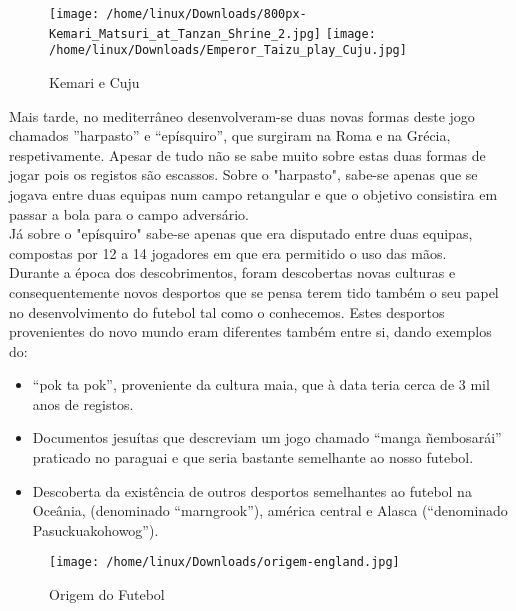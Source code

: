 \documentclass[a4paper,12pt]{report}
\begin{document}
\begin{figure}[!htp]
\texttt{[image: /home/linux/Downloads/800px-Kemari\_Matsuri\_at\_Tanzan\_Shrine\_2.jpg]}
\texttt{[image: /home/linux/Downloads/Emperor\_Taizu\_play\_Cuju.jpg]}
\caption{Kemari e Cuju}
\end{figure}

\newpage
Mais tarde, no mediterrâneo desenvolveram-se duas novas formas deste jogo chamados ”harpasto” e “epísquiro”, que surgiram na Roma e na Grécia, respetivamente. Apesar de tudo não se sabe muito sobre estas duas formas de jogar pois os registos são escassos. Sobre o "harpasto", sabe-se apenas que se jogava entre duas equipas num campo retangular e que o objetivo consistira em passar a bola para o campo adversário.\\ 
Já sobre o "epísquiro"   sabe-se apenas que era disputado entre duas equipas, compostas por 12 a 14 jogadores em que era permitido o uso das mãos. \\
Durante a época dos descobrimentos, foram descobertas novas culturas e consequentemente novos desportos que se pensa terem tido também o seu papel no desenvolvimento do futebol tal como o conhecemos. Estes desportos provenientes do novo mundo eram diferentes também entre si, dando exemplos do:

\begin{itemize}
\item “pok ta pok”, proveniente da cultura maia, que à data teria cerca de 3 mil anos de registos. 
\item Documentos jesuítas que descreviam um jogo chamado “manga ñembosarái” praticado no paraguai e que seria bastante semelhante ao nosso futebol. 
\item Descoberta da existência de outros desportos semelhantes ao futebol na Oceânia, (denominado “marngrook”), américa central e Alasca (“denominado Pasuckuakohowog”). 
\end{itemize}  

\begin{figure}[!htp]
\centering 
\texttt{[image: /home/linux/Downloads/origem-england.jpg]}
\caption{Origem do Futebol}
\end{figure}
\end{document}
